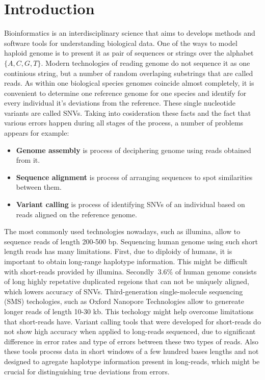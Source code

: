 \documentclass[a4paper, 12pt]{article}
\theoremstyle{definition}
\theoremstyle{definition}
\theoremstyle{remark}
\begin{document}
\section{Introduction}
Bioinformatics is an interdisciplinary science that aims 
to develops methods and software tools 
for understanding biological data. 
One of the ways to model haploid genome is to present it as 
pair of sequences or strings over the alphabet $\{ A, C, G, T \}$. 
Modern technologies of reading genome do not sequence it as one 
continious string, but a number of random overlaping substrings 
that are called reads. 
As within one biological species genomes coincide almost completely, 
it is convenient to determine one reference genome for one species 
and identify for every individual it's deviations from the reference.
These single nucleotide variants are called SNVs.  
Taking into cosideration these facts and the fact that various 
errors happen during all stages of the process, a number of 
problems appears for example:
\begin{itemize}
    \item \textbf{Genome assembly} is process of  
    deciphering genome using reads obtained from it.
    
    \item \textbf{Sequence alignment} is process of 
    arranging sequences to spot similarities between them. 
    
    \item \textbf{Variant calling} is process of identifying 
    SNVs of an individual based on reads aligned on the reference genome.
\end{itemize}

The most commonly used technologies nowadays, 
such as illumina, allow to sequence reads of length 200-500 bp.
Sequencing human genome using such short length reads 
has many limitations. 
First, due to diploidy of humans, it is important to obtain
long-range haplotype information. This might be difficult 
with short-reads provided by illumina. Secondly $~3.6\%$ of 
human genome consists of long highly repetative 
duplicated regeions that can not be uniquely aligned, 
which lowers accuracy of SNVs. 
Third-generation single-molecule sequencing (SMS) techologies,
such as Oxford Nanopore Technologies allow to   
genereate longer reads of length 10-30 kb. 
This techology might help overcome limitations that 
short-reads have. Variant calling tools that were developed 
for short-reads do not show high accuracy when applied 
to long-reads sequenced, due to significant difference 
in error rates and type of errors between these two types of reads. 
Also these tools process data in short windows 
of a few hundred bases lengths and not designed to agregate  
haplotype information present in long-reads, 
which might be crucial for distinguishing true deviations 
from errors.  
\end{document}
